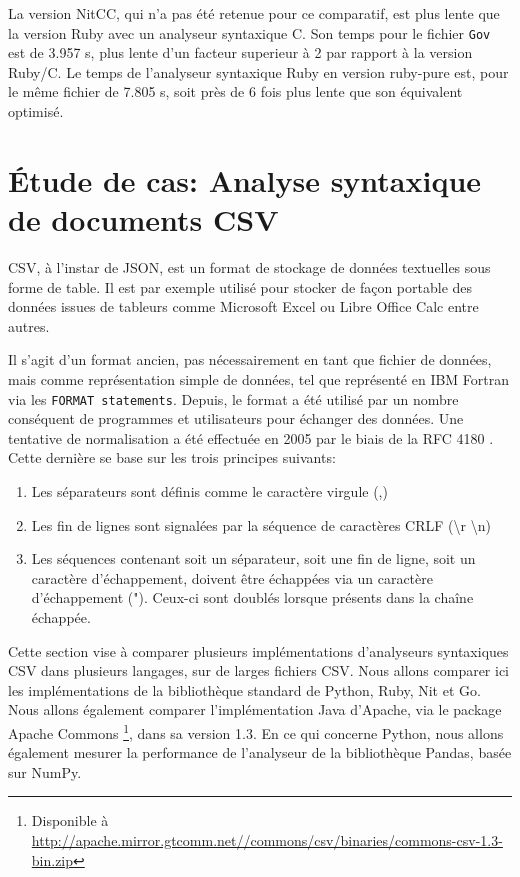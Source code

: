 La version NitCC, qui n'a pas été retenue pour ce comparatif, est plus lente que
la version Ruby avec un analyseur syntaxique C.
Son temps pour le fichier \texttt{Gov} est de 3.957 s, plus lente d'un facteur superieur à
2 par rapport à la version Ruby/C.
Le temps de l'analyseur syntaxique Ruby en version ruby-pure est, pour le même fichier de 7.805 s, soit près de 6 fois plus
lente que son équivalent optimisé.

\section{Étude de cas: Analyse syntaxique de documents CSV}

CSV, à l'instar de JSON, est un format de stockage de données textuelles sous forme de table.
Il est par exemple utilisé pour stocker de façon portable des données issues de tableurs comme
Microsoft Excel ou Libre Office Calc entre autres.

Il s'agit d'un format ancien, pas nécessairement en tant que fichier de données, mais comme représentation
simple de données, tel que représenté en IBM Fortran \cite{ibmfortran74} via les \texttt{FORMAT statements}.
Depuis, le format a été utilisé par un nombre conséquent de programmes et utilisateurs pour
échanger des données.
Une tentative de normalisation a été effectuée en 2005 par le biais de la RFC 4180 \cite{rfccsv}.
Cette dernière se base sur les trois principes suivants:

\begin{enumerate}
	\item Les séparateurs sont définis comme le caractère virgule (,)
	\item Les fin de lignes sont signalées par la séquence de caractères CRLF (\textbackslash r \textbackslash n)
	\item Les séquences contenant soit un séparateur, soit une fin de ligne, soit un caractère d'échappement, doivent être échappées via un caractère d'échappement ("). Ceux-ci sont doublés lorsque présents dans la chaîne échappée.
\end{enumerate}

Cette section vise à comparer plusieurs implémentations d'analyseurs syntaxiques CSV dans plusieurs langages,
sur de larges fichiers CSV.
Nous allons comparer ici les implémentations de la bibliothèque standard de Python, Ruby, Nit et Go.
Nous allons également comparer l'implémentation Java d'Apache, via le package Apache Commons
\footnote{Disponible à \url{http://apache.mirror.gtcomm.net//commons/csv/binaries/commons-csv-1.3-bin.zip}}, dans sa version 1.3.
En ce qui concerne Python, nous allons également mesurer la performance de l'analyseur de la bibliothèque
Pandas, basée sur NumPy.

